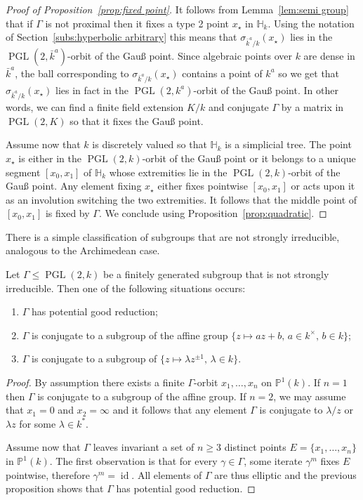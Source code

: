 \documentclass[10pt]{amsart}
\theoremstyle{definition}\newtheorem{defi}[theo]{Definition}\newtheorem{rema}[theo]{Remark}\newtheorem{exam}[theo]{Example}\newtheorem{exem}[theo]{Example}\newtheorem{nota}[theo]{Notation}
\DeclareMathOperator{\id}{id}
\DeclareMathOperator{\PGL}{PGL}
\newcommand{\pp}{\mathbb{P}}
\newcommand{\hh}{\mathbb{H}}
\newcommand{\PGLk}{\PGL(2, k)}
\begin{document}
\begin{proof}[Proof of Proposition~\ref{prop:fixed point}]
It follows from Lemma~\ref{lem:semi group} that if $\Gamma$ is not proximal then it fixes a type 2 point $x_\star$ in $\hh_k$. Using the notation of Section~\ref{subs:hyperbolic arbitrary} this means that $\sigma_{\bar{k}^a/k}(x_\star)$ lies in the $\PGL(2,\bar{k}^a)$-orbit of the Gau\ss{} point. Since algebraic points over $k$ are dense in $\bar{k}^a$, the ball corresponding to $\sigma_{\bar{k}^a/k}(x_\star)$ contains a point of $k^a$ so we get that $\sigma_{\bar{k}^a/k}(x_\star)$ lies in fact in the $\PGL(2,k^a)$-orbit of the Gau\ss{} point. In other words, we can find a finite field extension $K/k$ and conjugate $\Gamma$ by a matrix in $\PGL(2,K)$ so that it fixes the Gau\ss{} point.

Assume now that $k$ is discretely valued so that $\hh_k$ is a simplicial tree. The point $x_\star$ is either in the $\PGL(2,k)$-orbit of the Gau\ss{} point or it belongs to a unique segment $[x_0,x_1]$ of $\hh_k$ whose extremities lie in the $\PGL(2,k)$-orbit of the Gau\ss{} point. Any element fixing $x_\star$ either fixes pointwise $[x_0,x_1]$ or acts upon it as an involution switching the two extremities. It follows that the middle point of $[x_0,x_1]$ is fixed by $\Gamma$. We conclude using Proposition~\ref{prop:quadratic}.
\end{proof}


There is a simple classification of subgroups that are not strongly irreducible, analogous to the Archimedean case.

\begin{prop}\label{prop:strongly irreducible}
Let $\Gamma\leq \PGLk$ be a finitely generated subgroup that is not strongly irreducible. Then one of the following situations occurs:
\begin{enumerate}
\item $\Gamma$ has potential good reduction;
\item $\Gamma$ is conjugate to a subgroup of the affine group $\{z\mapsto a z + b, \, a \in k^\times, \, b\in k\}$;
\item $\Gamma$ is conjugate to a subgroup of $\{z\mapsto \lambda z^{\pm 1},\, \lambda \in k\}$.
\end{enumerate}
\end{prop}

\begin{proof}
By assumption there exists a finite $\Gamma$-orbit $x_1, \ldots, x_n$ on $\pp^1(k)$. If $n=1$ then $\Gamma$ is conjugate to a subgroup of the affine group. If $n=2$, we may assume that $x_1 =0$ and $x_2 =\infty$ and it follows that any element $\Gamma$ is conjugate to $\lambda /z$ or $\lambda z$ for some $\lambda\in k^*$.

Assume now that $\Gamma$ leaves invariant a set of $n\ge3$ distinct points $E= \{ x_1, \ldots, x_n \}$ in $\pp^1(k)$. The first observation is that for every $\gamma\in \Gamma$, some iterate $\gamma^m$ fixes $E$ pointwise, therefore $\gamma^m = \id$. All elements of $\Gamma$ are thus elliptic and the previous proposition shows that $\Gamma$ has potential good reduction.
\end{proof}
\end{document}
